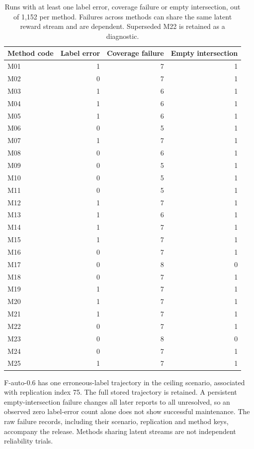 \documentclass[11pt]{article}
\theoremstyle{remark}
\begin{document}
\begin{table}[t]
\centering
\caption{Runs with at least one label error, coverage failure or empty intersection, out of 1,152 per method. Failures across methods can share the same latent reward stream and are dependent. Superseded M22 is retained as a diagnostic.}
\label{tab:failure-counts}
\footnotesize
\begin{tabular}{lrrr}
\toprule
Method code & Label error & Coverage failure & Empty intersection \\
\midrule
M01 & 1 & 7 & 1 \\
M02 & 0 & 7 & 1 \\
M03 & 1 & 6 & 1 \\
M04 & 1 & 6 & 1 \\
M05 & 1 & 6 & 1 \\
M06 & 0 & 5 & 1 \\
M07 & 1 & 7 & 1 \\
M08 & 0 & 6 & 1 \\
M09 & 0 & 5 & 1 \\
M10 & 0 & 5 & 1 \\
M11 & 0 & 5 & 1 \\
M12 & 1 & 7 & 1 \\
M13 & 1 & 6 & 1 \\
M14 & 1 & 7 & 1 \\
M15 & 1 & 7 & 1 \\
M16 & 0 & 7 & 1 \\
M17 & 0 & 8 & 0 \\
M18 & 0 & 7 & 1 \\
M19 & 1 & 7 & 1 \\
M20 & 1 & 7 & 1 \\
M21 & 1 & 7 & 1 \\
M22 & 0 & 7 & 1 \\
M23 & 0 & 8 & 0 \\
M24 & 0 & 7 & 1 \\
M25 & 1 & 7 & 1 \\
\bottomrule
\end{tabular}
\end{table}

F-auto-0.6 has one erroneous-label trajectory in the ceiling scenario, associated with replication index 75. The full stored trajectory is retained. A persistent empty-intersection failure changes all later reports to all unresolved, so an observed zero label-error count alone does not show successful maintenance. The raw failure records, including their scenario, replication and method keys, accompany the release. Methods sharing latent streams are not independent reliability trials.
\end{document}
